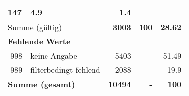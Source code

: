 \begin{longtable}{lXrrr}
       \num{147} &
       \num[round-mode=places,round-precision=2]{4,9} &
         \num[round-mode=places,round-precision=2]{1,4} \\
     \midrule
     \multicolumn{2}{l}{Summe (gültig)} &
       \textbf{\num{3003}} &
     \textbf{100} &
       \textbf{\num[round-mode=places,round-precision=2]{28,62}} \\
     \multicolumn{5}{l}{\textbf{Fehlende Werte}}\\
       -998 &
       keine Angabe &
         \num{5403} &
        - &
         \num[round-mode=places,round-precision=2]{51,49} \\
       -989 &
       filterbedingt fehlend &
         \num{2088} &
        - &
         \num[round-mode=places,round-precision=2]{19,9} \\
     \midrule
     \multicolumn{2}{l}{\textbf{Summe (gesamt)}} &
          \textbf{\num{10494}} &
        \textbf{-} &
        \textbf{100} \\
     \bottomrule
     \end{longtable}
     
